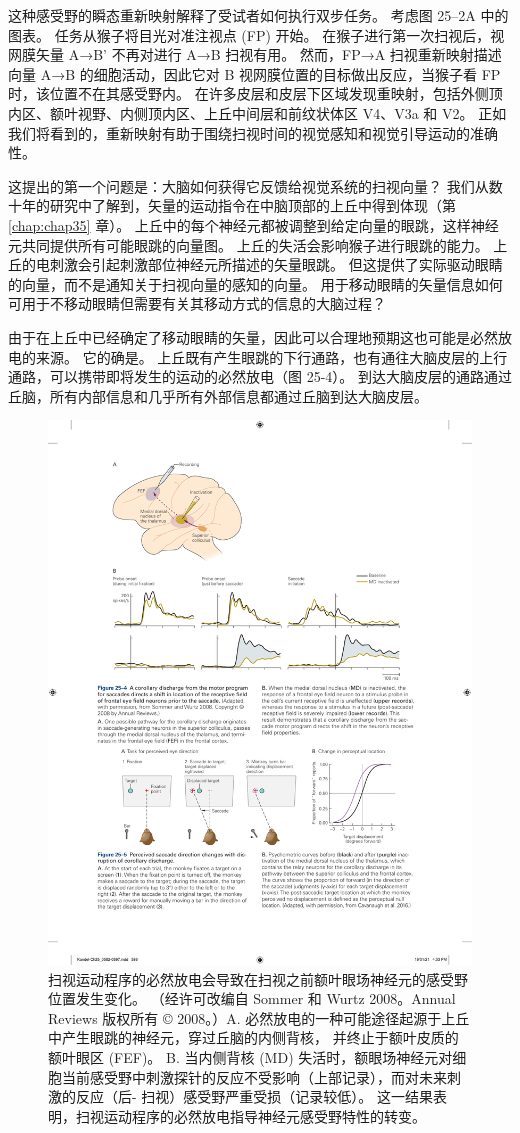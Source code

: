 这种感受野的瞬态重新映射解释了受试者如何执行双步任务。 考虑图 25–2A 中的图表。 任务从猴子将目光对准注视点 (FP) 开始。 在猴子进行第一次扫视后，视网膜矢量 A→B' 不再对进行 A→B 扫视有用。 然而，FP→A 扫视重新映射描述向量 A→B 的细胞活动，因此它对 B 视网膜位置的目标做出反应，当猴子看 FP 时，该位置不在其感受野内。 在许多皮层和皮层下区域发现重映射，包括外侧顶内区、额叶视野、内侧顶内区、上丘中间层和前纹状体区 V4、V3a 和 V2。 正如我们将看到的，重新映射有助于围绕扫视时间的视觉感知和视觉引导运动的准确性。

这提出的第一个问题是：大脑如何获得它反馈给视觉系统的扫视向量？ 我们从数十年的研究中了解到，矢量的运动指令在中脑顶部的上丘中得到体现（第 \ref{chap:chap35} 章）。 上丘中的每个神经元都被调整到给定向量的眼跳，这样神经元共同提供所有可能眼跳的向量图。 上丘的失活会影响猴子进行眼跳的能力。 上丘的电刺激会引起刺激部位神经元所描述的矢量眼跳。 但这提供了实际驱动眼睛的向量，而不是通知关于扫视向量的感知的向量。 用于移动眼睛的矢量信息如何可用于不移动眼睛但需要有关其移动方式的信息的大脑过程？

由于在上丘中已经确定了移动眼睛的矢量，因此可以合理地预期这也可能是必然放电的来源。 它的确是。 上丘既有产生眼跳的下行通路，也有通往大脑皮层的上行通路，可以携带即将发生的运动的必然放电（图 25-4）。 
到达大脑皮层的通路通过丘脑，所有内部信息和几乎所有外部信息都通过丘脑到达大脑皮层。

\begin{figure}[htbp]
	\centering
	\includegraphics[width=0.8\linewidth]{chap25/fig_25_4}
	\caption{扫视运动程序的必然放电会导致在扫视之前额叶眼场神经元的感受野位置发生变化。 （经许可改编自 Sommer 和 Wurtz 2008。Annual Reviews 版权所有 © 2008。）A. 必然放电的一种可能途径起源于上丘中产生眼跳的神经元，穿过丘脑的内侧背核， 并终止于额叶皮质的额叶眼区 (FEF)。 B. 当内侧背核 (MD) 失活时，额眼场神经元对细胞当前感受野中刺激探针的反应不受影响（上部记录），而对未来刺激的反应（后- 扫视）感受野严重受损（记录较低）。 这一结果表明，扫视运动程序的必然放电指导神经元感受野特性的转变。}
	\label{fig:25_4}
\end{figure}


